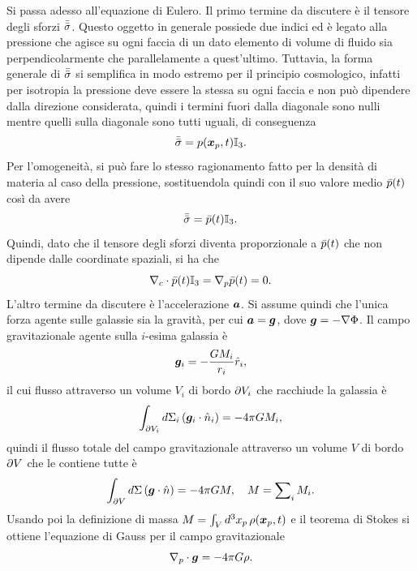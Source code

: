 Si passa adesso all'equazione di Eulero. Il primo termine da discutere è il tensore degli sforzi $\bar{\bar{\sigma}}$. Questo oggetto in generale possiede due indici ed è legato alla pressione che agisce su ogni faccia di un dato elemento di volume di fluido sia perpendicolarmente che parallelamente a quest'ultimo. Tuttavia, la forma generale di $\bar{\bar{\sigma}}$ si semplifica in modo estremo per il principio cosmologico, infatti per isotropia la pressione deve essere la stessa su ogni faccia e non può dipendere dalla direzione considerata, quindi i termini fuori dalla diagonale sono nulli mentre quelli sulla diagonale sono tutti uguali, di conseguenza
\begin{equation}
\label{eq: evoluzione densità di massa}
    \bar{\bar{\sigma}} = p(\bm{x}_p,t)\mathbb{I}_3.
\end{equation}
Per l'omogeneità, si può fare lo stesso ragionamento fatto per la densità di materia al caso della pressione, sostituendola quindi con il suo valore medio $\bar{p}(t)$ così da avere
\begin{equation}
    \bar{\bar{\sigma}} = \bar{p}(t)\mathbb{I}_3.
\end{equation}
Quindi, dato che il tensore degli sforzi diventa proporzionale a $\bar{p}(t)$ che non dipende dalle coordinate spaziali, si ha che
\begin{equation}
    \nabla_c \cdot \bar{p}(t)\mathbb{I}_3 = \nabla_p \bar{p}(t) = 0.
\end{equation}
L'altro termine da discutere è l'accelerazione $\bm{a}$. Si assume quindi che l'unica forza agente sulle galassie sia la gravità, per cui $\bm{a} = \bm{g}$, dove $\bm{g} = -\nabla\Phi$. Il campo gravitazionale agente sulla $i$-esima galassia è
\begin{equation}
    \bm{g}_i = -\frac{GM_i}{r_i}\hat{r}_i,
\end{equation}
il cui flusso attraverso un volume $V_i$ di bordo $\partial V_i$ che racchiude la galassia è
\begin{equation}
    \int_{\partial V_i}d\Sigma_i\,(\bm{g}_i \cdot \hat{n}_i) = -4\pi GM_i,
\end{equation}
quindi il flusso totale del campo gravitazionale attraverso un volume $V$ di bordo $\partial V$ che le contiene tutte è
\begin{equation}
    \int_{\partial V}d\Sigma\,(\bm{g} \cdot \hat{n}) = -4\pi GM,\quad M = \sum\nolimits_iM_i.
\end{equation}
Usando poi la definizione di massa $M = \int_V d^3x_p\,\rho(\bm{x}_p,t)$ e il teorema di Stokes si ottiene l'equazione di Gauss per il campo gravitazionale
\begin{equation}
\label{eq: equazione di Gauss del campo gravitazionale}
    \nabla_p \cdot \bm{g} = -4\pi G\rho.
\end{equation}
